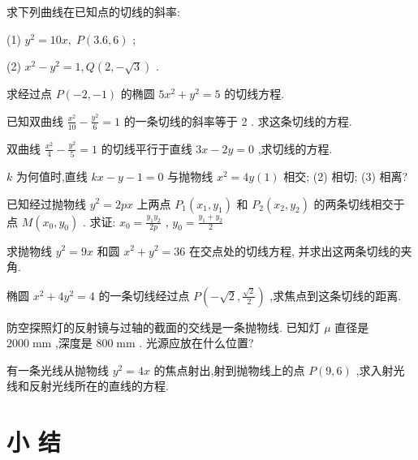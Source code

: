 \documentclass[lang=cn,newtx,10pt,scheme=chinese]{elegantbook}
\begin{document}
\begin{problemset}[习 题 九]

\item 求下列曲线在已知点的切线的斜率:

(1) \({y}^{2} = {10x},\;P\left( {{3.6},6}\right)\) ;

(2) \({x}^{2} - {y}^{2} = 1,Q\left( {2, - \sqrt{3}}\right)\) .

\item 求经过点 \(P\left( {-2, - 1}\right)\) 的椭圆 \(5{x}^{2} + {y}^{2} = 5\) 的切线方程.

\item 已知双曲线 \(\frac{{x}^{2}}{10} - \frac{{y}^{2}}{6} = 1\) 的一条切线的斜率等于 2 . 求这条切线的方程.

\item 双曲线 \(\frac{{x}^{2}}{4} - \frac{{y}^{2}}{5} = 1\) 的切线平行于直线 \({3x} - {2y} = 0\) ,求切线的方程.

\item \(k\) 为何值时,直线 \({kx} - y - 1 = 0\) 与抛物线 \({x}^{2} = {4y}\left( 1\right)\) 相交; (2) 相切; (3) 相离?

\item 已知经过抛物线 \({y}^{2} = {2px}\) 上两点 \({P}_{1}\left( {{x}_{1},{y}_{1}}\right)\) 和 \({P}_{2}\left( {{x}_{2},{y}_{2}}\right)\) 的两条切线相交于点 \(M\left( {{x}_{0},{y}_{0}}\right)\) . 求证: \({x}_{0} = \frac{{y}_{1}{y}_{2}}{2p}\) , \({y}_{0} = \frac{{y}_{1} + {y}_{2}}{2}\)

\item 求抛物线 \({y}^{2} = {9x}\) 和圆 \({x}^{2} + {y}^{2} = {36}\) 在交点处的切线方程, 并求出这两条切线的夹角.

\item 椭圆 \({x}^{2} + 4{y}^{2} = 4\) 的一条切线经过点 \(P\left( {-\sqrt{2},\frac{\sqrt{2}}{2}}\right)\) ,求焦点到这条切线的距离.

\item 防空探照灯的反射镜与过轴的截面的交线是一条抛物线. 已知灯 \(\mu\) 直径是 \({2000}\mathrm{\;{mm}}\) ,深度是 \({800}\mathrm{\;{mm}}\) . 光源应放在什么位置?

\item 有一条光线从抛物线 \({y}^{2} = {4x}\) 的焦点射出,射到抛物线上的点 \(P\left( {9,6}\right)\) ,求入射光线和反射光线所在的直线的方程.
\end{problemset}

\chapter*{小 结}
\end{document}
